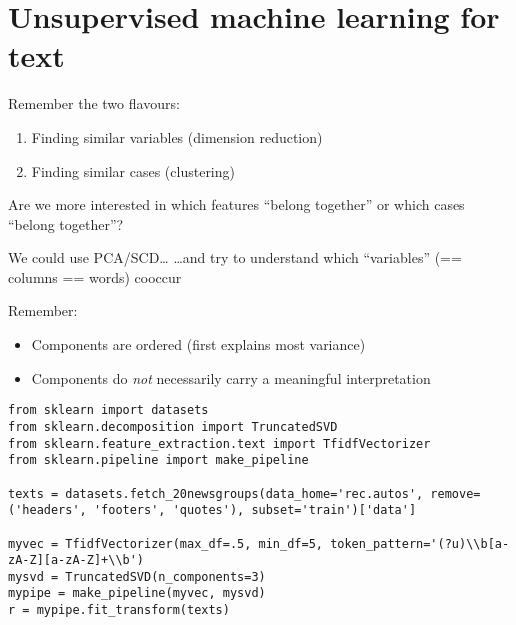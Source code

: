 \section[Unsupervised ML]{Unsupervised machine learning for text}




\begin{frame}{Remember the two flavours:}

\begin{enumerate}
\item Finding similar variables (dimension reduction)
\item Finding similar cases (clustering)
\end{enumerate}

\pause

Are we more interested in which features ``belong together'' or which cases ``belong together''? 

\end{frame}


\begin{frame}{We could use PCA/SCD\ldots}
  \ldots and try to understand which ``variables'' (== columns == words) cooccur

  Remember:
\begin{itemize}
\item Components are ordered (first explains most variance)
\item Components do \emph{not} necessarily carry a meaningful interpretation
\end{itemize}
\end{frame}




\begin{frame}{}
  \begin{verbatim}
from sklearn import datasets
from sklearn.decomposition import TruncatedSVD
from sklearn.feature_extraction.text import TfidfVectorizer
from sklearn.pipeline import make_pipeline

texts = datasets.fetch_20newsgroups(data_home='rec.autos', remove=('headers', 'footers', 'quotes'), subset='train')['data']

myvec = TfidfVectorizer(max_df=.5, min_df=5, token_pattern='(?u)\\b[a-zA-Z][a-zA-Z]+\\b')
mysvd = TruncatedSVD(n_components=3)
mypipe = make_pipeline(myvec, mysvd)
r = mypipe.fit_transform(texts)
\end{verbatim}
\end{frame}





